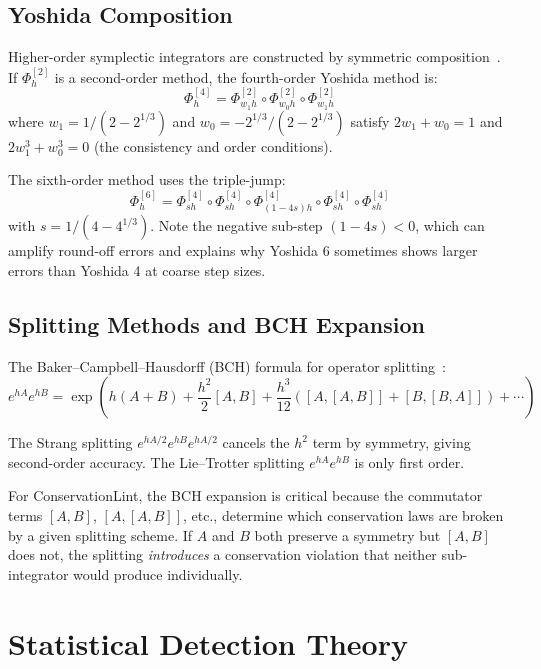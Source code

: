 \documentclass[11pt,a4paper]{article}
\begin{document}
\subsection{Yoshida Composition}

Higher-order symplectic integrators are constructed by symmetric composition~\citep{yoshida1990}. If $\Phi_h^{[2]}$ is a second-order method, the fourth-order Yoshida method is:
\begin{equation}
    \Phi_h^{[4]} = \Phi_{w_1 h}^{[2]} \circ \Phi_{w_0 h}^{[2]} \circ \Phi_{w_1 h}^{[2]}
\end{equation}
where $w_1 = 1/(2 - 2^{1/3})$ and $w_0 = -2^{1/3}/(2 - 2^{1/3})$ satisfy $2w_1 + w_0 = 1$ and $2w_1^3 + w_0^3 = 0$ (the consistency and order conditions).

The sixth-order method uses the triple-jump:
\begin{equation}
    \Phi_h^{[6]} = \Phi_{s h}^{[4]} \circ \Phi_{s h}^{[4]} \circ \Phi_{(1-4s) h}^{[4]} \circ \Phi_{s h}^{[4]} \circ \Phi_{s h}^{[4]}
\end{equation}
with $s = 1/(4 - 4^{1/3})$. Note the negative sub-step $(1 - 4s) < 0$, which can amplify round-off errors and explains why Yoshida 6 sometimes shows larger errors than Yoshida 4 at coarse step sizes.

\subsection{Splitting Methods and BCH Expansion}

The Baker--Campbell--Hausdorff (BCH) formula for operator splitting~\citep{mclachlan2002}:
\begin{equation}
    e^{hA} e^{hB} = \exp\left(h(A+B) + \frac{h^2}{2}[A, B] + \frac{h^3}{12}([A,[A,B]] + [B,[B,A]]) + \cdots\right)
\end{equation}

The Strang splitting $e^{hA/2} e^{hB} e^{hA/2}$ cancels the $h^2$ term by symmetry, giving second-order accuracy. The Lie--Trotter splitting $e^{hA} e^{hB}$ is only first order.

For ConservationLint, the BCH expansion is critical because the commutator terms $[A, B]$, $[A, [A, B]]$, etc., determine which conservation laws are broken by a given splitting scheme. If $A$ and $B$ both preserve a symmetry but $[A, B]$ does not, the splitting \emph{introduces} a conservation violation that neither sub-integrator would produce individually.

\section{Statistical Detection Theory}
\label{app:detection-theory}
\end{document}
